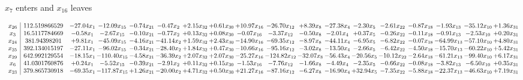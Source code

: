 \documentclass[9pt]{article}
\begin{document}
 $ x_{7} $ enters and $ x_{16} $ leaves 

 \[\begin{array}{c| c c@{\hskip 2pt} c@{\hskip 2pt} c@{\hskip 2pt} c@{\hskip 2pt} c@{\hskip 2pt} c@{\hskip 2pt} c@{\hskip 2pt} c@{\hskip 2pt} c@{\hskip 2pt} c@{\hskip 2pt} c@{\hskip 2pt} c@{\hskip 2pt} c@{\hskip 2pt} c@{\hskip 2pt} c@{\hskip 2pt} c@{\hskip 2pt} }
 x_{26}   &  112.519866529 & -27.04 x_{1} & -12.09 x_{15} & -0.74 x_{21} & -0.47 x_{2} & +  2.15 x_{32} & +  0.61 x_{30} & + 10.97 x_{16} & -26.70 x_{12} & +  8.39 x_{8} & -27.38 x_{4} & -2.30 x_{5} & -2.61 x_{22} & -0.87 x_{18} & -1.93 x_{13} & -35.12 x_{10} & +  1.36 x_{31}\\
 x_{3}   &  16.5117784669 & -0.58 x_{1} & -2.67 x_{15} & -0.10 x_{21} & -0.77 x_{2} & +  0.13 x_{32} & +  0.08 x_{30} & -0.07 x_{16} & -3.37 x_{12} & -0.50 x_{8} & -2.01 x_{4} & +  0.37 x_{5} & -0.26 x_{22} & -0.11 x_{18} & -0.91 x_{13} & -2.53 x_{10} & +  0.20 x_{31}\\
 x_{24}   &  381.94398201 & +  9.81 x_{1} & -45.09 x_{15} & -4.16 x_{21} & -41.14 x_{2} & +  1.59 x_{32} & +  2.43 x_{30} & -14.90 x_{16} & -69.35 x_{12} & -8.97 x_{8} & -44.11 x_{4} & -6.95 x_{5} & -6.82 x_{22} & -0.07 x_{18} & -64.99 x_{13} & -57.10 x_{10} & +  4.80 x_{31}\\
 x_{25}   &  392.134015197 & -27.11 x_{1} & -96.02 x_{15} & -0.34 x_{21} & -28.40 x_{2} & +  1.84 x_{32} & +  0.47 x_{30} & -10.66 x_{16} & -95.16 x_{12} & -3.02 x_{8} & -13.50 x_{4} & -2.66 x_{5} & -6.42 x_{22} & -4.50 x_{18} & -15.70 x_{13} & -60.22 x_{10} & +  5.42 x_{31}\\
 x_{29}   &  642.992129554 & -18.15 x_{1} & -110.40 x_{15} & -4.58 x_{21} & -36.39 x_{2} & +  2.07 x_{32} & +  2.07 x_{30} & -25.27 x_{16} & -124.82 x_{12} & -32.07 x_{8} & -56.43 x_{4} & -20.56 x_{5} & -10.12 x_{22} & -2.64 x_{18} & -61.21 x_{13} & -99.40 x_{10} & +  6.17 x_{31}\\
 x_{6}   &  41.0301760876 & +  0.24 x_{1} & -5.52 x_{15} & -0.39 x_{21} & -2.91 x_{2} & +  0.11 x_{32} & +  0.15 x_{30} & -1.53 x_{16} & -7.76 x_{12} & -1.66 x_{8} & -4.49 x_{4} & -2.35 x_{5} & -0.66 x_{22} & -0.08 x_{18} & -3.82 x_{13} & -6.50 x_{10} & +  0.35 x_{31}\\
 x_{23}   &  379.865730918 & -69.35 x_{1} & -117.87 x_{15} & +  1.26 x_{21} & -20.00 x_{2} & +  4.71 x_{32} & +  0.50 x_{30} & + 21.27 x_{16} & -87.16 x_{12} & -6.27 x_{8} & -16.90 x_{4} & + 32.94 x_{5} & -7.35 x_{22} & -5.88 x_{18} & -22.37 x_{13} & -46.63 x_{10} & +  7.19 x_{31}\\

\end{array}\]
\end{document}
